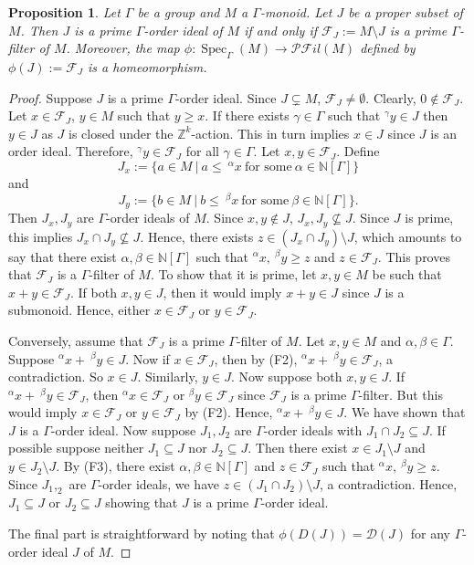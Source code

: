 \documentclass[a4paper,reqno,12pt]{amsart}
\numberwithin{equation}{section}
\newtheorem{prop}[thm]{Proposition}
\theoremstyle{definition}
\theoremstyle{remark}
\newcommand{\Spec}{\operatorname{Spec}}
\begin{document}
\begin{prop}\label{pro dual of prime order ideals}
Let $\Gamma$ be a group and $M$ a $\Gamma$-monoid. Let $J$ be a proper subset of $M$. Then $J$ is a prime $\Gamma$-order ideal of $M$ if and only if $\mathcal{F}_J:= M\setminus J$ is a prime $\Gamma$-filter of $M$. Moreover, the map $\phi:\Spec_\Gamma(M)\longrightarrow \mathscr{P}\mathscr{F}il(M)$ defined by $\phi(J):=\mathcal{F}_J$ is a homeomorphism.   
\end{prop}
\begin{proof}
Suppose $J$ is a prime $\Gamma$-order ideal. Since $J\subsetneq M$, $\mathcal{F}_J\neq \emptyset$. Clearly, $0\notin \mathcal{F}_J$. Let $x\in \mathcal{F}_J$, $y\in M$ such that $y\ge x$. If there exists $\gamma\in \Gamma$ such that $^\gamma y\in J$ then $y\in J$ as $J$ is closed under the $\mathbb{Z}^k$-action. This in turn implies $x\in J$ since $J$ is an order ideal. Therefore, $^\gamma y\in \mathcal{F}_J$ for all $\gamma\in \Gamma$. Let $x,y\in \mathcal{F}_J$. Define \[J_x:=\{a\in M~|~a\le~^\alpha x~\text{for some}~\alpha\in \mathbb{N}[\Gamma]\}\] and \[J_y:=\{b\in M~|~b\le~^\beta x~\text{for some}~\beta\in \mathbb{N}[\Gamma]\}.\] Then $J_x,J_y$ are $\Gamma$-order ideals of $M$. Since $x,y\notin J$, $J_x,J_y\nsubseteq J$. Since $J$ is prime, this implies $J_x\cap J_y\nsubseteq J$. Hence, there exists $z\in (J_x\cap J_y)\setminus J$, which amounts to say that there exist $\alpha,\beta\in \mathbb{N}[\Gamma]$ such that $^\alpha x,~^\beta y\ge z$ and $z\in \mathcal{F}_J$. This proves that $\mathcal{F}_J$ is a $\Gamma$-filter of $M$. To show that it is prime, let $x,y\in M$ be such that $x+y\in \mathcal{F}_J$. If both $x,y\in J$, then it would imply $x+y\in J$ since $J$ is a submonoid. Hence, either $x\in \mathcal{F}_J$ or $y\in \mathcal{F}_J$. 

Conversely, assume that $\mathcal{F}_J$ is a prime $\Gamma$-filter of $M$. Let $x,y\in M$ and $\alpha,\beta\in \Gamma$. Suppose $^\alpha x+~^\beta y\in J$. Now if $x\in \mathcal{F}_J$, then by (F2), $^\alpha x+~^\beta y\in \mathcal{F}_J$, a contradiction. So $x\in J$. Similarly, $y\in J$. Now suppose both $x,y\in J$. If $^\alpha x+~^\beta y\in \mathcal{F}_J$, then $^\alpha x\in \mathcal{F}_J$ or $^\beta y\in \mathcal{F}_J$ since $\mathcal{F}_J$ is a prime $\Gamma$-filter. But this would imply $x\in \mathcal{F}_J$ or $y\in \mathcal{F}_J$ by (F2). Hence, $^\alpha x+~^\beta y\in J$. We have shown that $J$ is a $\Gamma$-order ideal. Now suppose $J_1,J_2$ are $\Gamma$-order ideals with $J_1\cap J_2\subseteq J$. If possible suppose neither $J_1\subseteq J$ nor $J_2\subseteq J$. Then there exist $x\in J_1\setminus J$ and $y\in J_2\setminus J$. By (F3), there exist $\alpha,\beta\in \mathbb{N}[\Gamma]$ and $z\in \mathcal{F}_J$ such that $^\alpha x,~^\beta y\ge z$. Since $J_1,_2$ are $\Gamma$-order ideals, we have $z\in (J_1\cap J_2)\setminus J$, a contradiction. Hence, $J_1\subseteq J$ or $J_2\subseteq J$ showing that $J$ is a prime $\Gamma$-order ideal. 

The final part is straightforward by noting that $\phi(D(J))=\mathscr{D}(J)$ for any $\Gamma$-order ideal $J$ of $M$.    
\end{proof}
\end{document}
